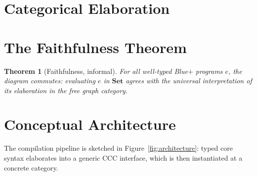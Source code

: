 \documentclass[11pt]{report}
\newtheorem{theorem}{Theorem}[chapter]
\theoremstyle{definition}
\begin{document}
\begin{mainf}

\section{Categorical Elaboration}
\label{sec:proposal-elaboration}


\section{The Faithfulness Theorem}
\label{sec:proposal-theorem}


\begin{theorem}[Faithfulness, informal]
    For all well-typed Blue$+$ programs $e$, the diagram commutes:
    evaluating $e$ in $\mathbf{Set}$ agrees with the universal interpretation
    of its elaboration in the free graph category.
\end{theorem}


\section{Conceptual Architecture}
\label{sec:proposal-architecture}

The compilation pipeline is sketched in Figure~\ref{fig:architecture}: typed
core syntax elaborates into a generic CCC interface, which is then
instantiated at a concrete category.


\end{mainf}
\end{document}
